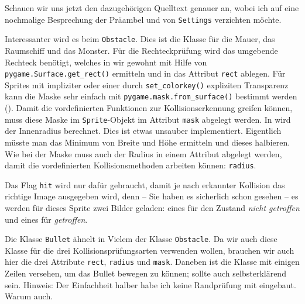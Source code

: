 
Schauen wir uns jetzt den dazugehörigen Quelltext genauer an, wobei ich auf eine nochmalige Besprechung der Präambel und von \texttt{Settings} verzichten möchte. 


Interessanter wird es beim \texttt{Obstacle}. Dies ist die Klasse für die Mauer, das Raumschiff und das Monster. Für die Rechteckprüfung wird das umgebende Rechteck benötigt, welches in  wir gewohnt mit Hilfe von \texttt{pygame.Surface.get\_rect()} ermitteln und in das Attribut \texttt{rect} ablegen. Für Sprites mit impliziter oder einer durch \texttt{set\_colorkey()} expliziten Transparenz kann die Maske sehr einfach mit \texttt{pygame.\-mask.\-from\_surface()} bestimmt werden (). Damit die vordefinierten Funktionen zur Kollisionserkennung greifen können, muss diese Maske im \texttt{Sprite}-Objekt im Attribut \texttt{mask} abgelegt werden. In  wird der Innenradius berechnet. Dies ist etwas unsauber implementiert. Eigentlich müsste man das Minimum von Breite und Höhe ermitteln und dieses halbieren. Wie bei der Maske muss auch der Radius in einem Attribut abgelegt werden, damit die vordefinierten Kollisionsmethoden arbeiten können: \texttt{radius}. 

Das Flag \texttt{hit} wird nur dafür gebraucht, damit je nach erkannter Kollision das richtige Image ausgegeben wird, denn -- Sie haben es sicherlich schon gesehen -- es werden für dieses Sprite zwei Bilder geladen: eines für den Zustand \emph{nicht getroffen} und eines für \emph{getroffen}.


Die Klasse \texttt{Bullet} ähnelt in Vielem der Klasse \texttt{Obstacle}. Da wir auch diese Klasse für die drei Kollisionsprüfungsarten verwenden wollen, brauchen wir auch hier die drei Attribute \texttt{rect}, \texttt{radius} und \texttt{mask}. Daneben ist die Klasse mit einigen Zeilen versehen, um das Bullet bewegen zu können; sollte auch selbsterklärend sein. Hinweis: Der Einfachheit halber habe ich keine Randprüfung mit eingebaut. Warum auch.

